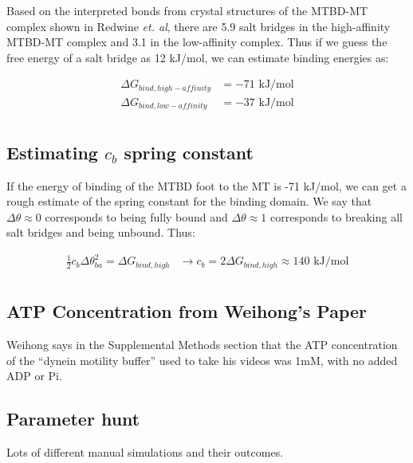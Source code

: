 \documentclass[10pt]{article} %
\begin{document}
Based on the interpreted bonds from crystal structures of the MTBD-MT complex shown in Redwine \textit{et. al}, there are 5.9 salt bridges in the high-affinity MTBD-MT
complex and 3.1 in the low-affinity complex. Thus if we guess the free energy of a salt bridge as 12 kJ/mol, we can estimate binding energies as:

\begin{align*}
  \Delta G_{bind, high-affinity} &= -71 \mbox{ kJ/mol}\\
  \Delta G_{bind, low-affinity} &= -37 \mbox{ kJ/mol}\\
\end{align*}

\subsection{Estimating $c_b$ spring constant}
If the energy of binding of the MTBD foot to the MT is -71 kJ/mol, we can get a rough estimate of the spring constant for the binding domain. We say that
$\Delta \theta \approx 0$ corresponds to being fully bound and $\Delta \theta \approx 1$ corresponds to breaking all salt bridges and being unbound. Thus:

\begin{align*}
  \frac 12 c_b \Delta \theta_{ba}^2 = \Delta G_{bind, high} &\rightarrow c_b = 2\Delta G_{bind, high} \approx 140 \mbox{ kJ/mol}\\
\end{align*}

\subsection{ATP Concentration from Weihong's Paper}
Weihong says in the Supplemental Methods section that the ATP concentration of the ``dynein motility buffer'' used to take his videos was 1mM, with no added ADP or Pi.\\

\subsection{Parameter hunt}
Lots of different manual simulations and their outcomes.
\end{document}
